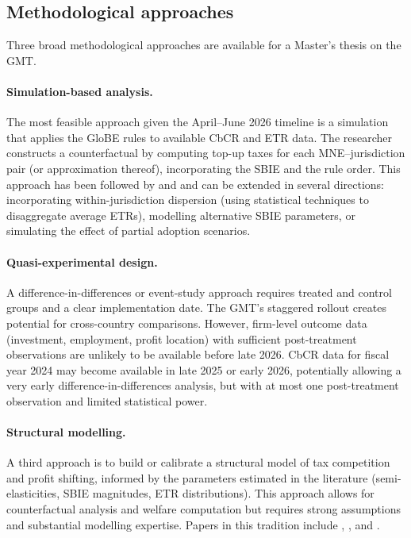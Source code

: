 \documentclass[12pt,a4paper]{article}
\begin{document}
\subsection{Methodological approaches}

Three broad methodological approaches are available for a Master's thesis on the GMT.

\paragraph{Simulation-based analysis.}
The most feasible approach given the April--June 2026 timeline is a simulation that applies the GloBE rules to available CbCR and ETR data.
The researcher constructs a counterfactual by computing top-up taxes for each MNE--jurisdiction pair (or approximation thereof), incorporating the SBIE and the rule order.
This approach has been followed by \textcite{barake2022} and \textcite{hugger2025} and can be extended in several directions: incorporating within-jurisdiction dispersion (using statistical techniques to disaggregate average ETRs), modelling alternative SBIE parameters, or simulating the effect of partial adoption scenarios.

\paragraph{Quasi-experimental design.}
A difference-in-differences or event-study approach requires treated and control groups and a clear implementation date.
The GMT's staggered rollout creates potential for cross-country comparisons.
However, firm-level outcome data (investment, employment, profit location) with sufficient post-treatment observations are unlikely to be available before late 2026.
CbCR data for fiscal year 2024 may become available in late 2025 or early 2026, potentially allowing a very early difference-in-differences analysis, but with at most one post-treatment observation and limited statistical power.

\paragraph{Structural modelling.}
A third approach is to build or calibrate a structural model of tax competition and profit shifting, informed by the parameters estimated in the literature (semi-elasticities, SBIE magnitudes, ETR distributions).
This approach allows for counterfactual analysis and welfare computation but requires strong assumptions and substantial modelling expertise.
Papers in this tradition include \textcite{Johannesen2022}, \textcite{janeba2023}, and \textcite{schjelderup2024}.
\end{document}
